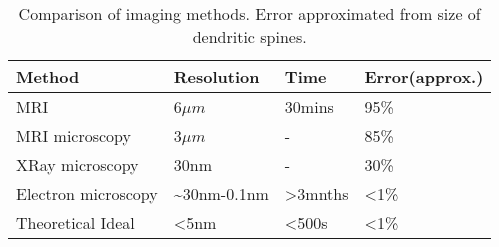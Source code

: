 \setlength{\tabcolsep}{4ex}
\renewcommand{\arraystretch}{1.1}
\begin{table}[ht]
    \centering
    \begin{tabular}{@{}llll@{}}
        Method              & Resolution                 & Time    & Error(approx.) \\
        \hline
        MRI                 & 6$\mu m$                   & 30mins  & 95\%           \\
        MRI microscopy      & 3$\mu m$                   & -       & 85\%           \\
        XRay microscopy     & 30nm                       & -       & 30\%           \\
        Electron microscopy & \textasciitilde 30nm-0.1nm & >3mnths & <1\%           \\
        Theoretical Ideal   & <5nm                       & <500s   & <1\%           \\
        \hline
    \end{tabular}
    \caption{Comparison of imaging methods. Error approximated from size of dendritic spines.}
    \label{imagemethodcomparison1}
\end{table}
\setlength{\tabcolsep}{1ex}